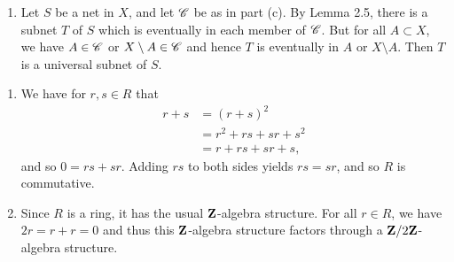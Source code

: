 \begin{prob}
\begin{enumerate}

\item Let $S$ be a net in $X$, and let $\mathscr{C}$ be as in part (c). By Lemma 2.5, there is a subnet $T$ of $S$ which is eventually in each member of $\mathscr{C}$. But for all $A \subset X$, we have $A \in \mathscr{C}$ or $X\setminus A \in \mathscr{C}$ and hence $T$ is eventually in $A$ or $X\setminus A$. Then $T$ is a universal subnet of $S$.
\end{enumerate}
\end{prob}

\begin{prob}
\begin{enumerate}
\item We have for $r, s \in R$ that
\begin{align*}
r + s & = (r + s)^2\\
& = r^2 + rs + sr + s^2\\
& = r + rs + sr + s,
\end{align*}
and so $0 = rs + sr$. Adding $rs$ to both sides yields $rs = sr$, and so $R$ is commutative.

\item Since $R$ is a ring, it has the usual $\mathbf{Z}$-algebra structure. For all $r \in R$, we have $2r = r + r = 0$ and thus this $\mathbf{Z}$-algebra structure factors through a $\mathbf{Z}/2\mathbf{Z}$-algebra structure.


\end{enumerate}
\end{prob}
